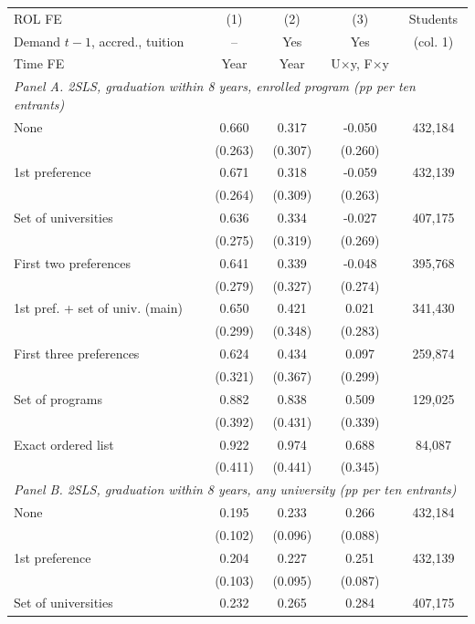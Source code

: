 \begin{tabular}{l*{4}{c}}
\toprule
ROL FE & (1) & (2) & (3) & Students \\
Demand \(t-1\), accred., tuition & -- & Yes & Yes & (col. 1) \\
Time FE & Year & Year & U\(\times\)y, F\(\times\)y & \\
\midrule
\multicolumn{5}{l}{\textit{Panel A. 2SLS, graduation within 8 years, enrolled program (pp per ten entrants)}} \\
None &  0.660\sym{**} &  0.317 & -0.050 &   432,184 \\
 & (0.263) & (0.307) & (0.260) & \\
1st preference &  0.671\sym{**} &  0.318 & -0.059 &   432,139 \\
 & (0.264) & (0.309) & (0.263) & \\
Set of universities &  0.636\sym{**} &  0.334 & -0.027 &   407,175 \\
 & (0.275) & (0.319) & (0.269) & \\
First two preferences &  0.641\sym{**} &  0.339 & -0.048 &   395,768 \\
 & (0.279) & (0.327) & (0.274) & \\
1st pref. + set of univ. (main) &  0.650\sym{**} &  0.421 &  0.021 &   341,430 \\
 & (0.299) & (0.348) & (0.283) & \\
First three preferences &  0.624\sym{*} &  0.434 &  0.097 &   259,874 \\
 & (0.321) & (0.367) & (0.299) & \\
Set of programs &  0.882\sym{**} &  0.838\sym{*} &  0.509 &   129,025 \\
 & (0.392) & (0.431) & (0.339) & \\
Exact ordered list &  0.922\sym{**} &  0.974\sym{**} &  0.688\sym{**} &    84,087 \\
 & (0.411) & (0.441) & (0.345) & \\
\midrule
\multicolumn{5}{l}{\textit{Panel B. 2SLS, graduation within 8 years, any university (pp per ten entrants)}} \\
None &  0.195\sym{*} &  0.233\sym{**} &  0.266\sym{***} &   432,184 \\
 & (0.102) & (0.096) & (0.088) & \\
1st preference &  0.204\sym{**} &  0.227\sym{**} &  0.251\sym{***} &   432,139 \\
 & (0.103) & (0.095) & (0.087) & \\
Set of universities &  0.232\sym{**} &  0.265\sym{***} &  0.284\sym{***} &   407,175 \\

\end{tabular}
